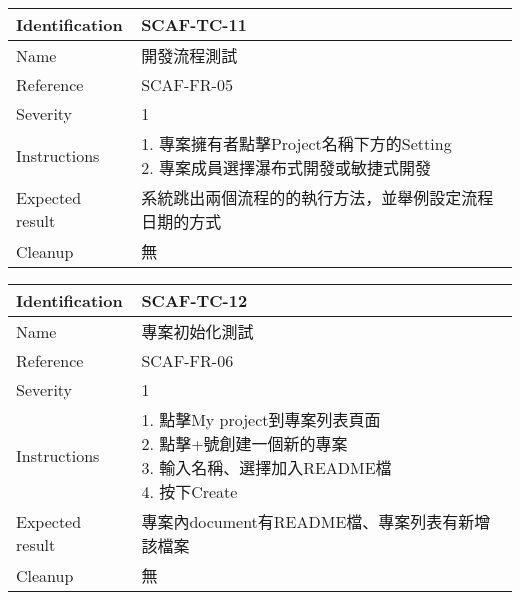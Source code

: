 \documentclass{report}
\begin{document}
\begin{tabularx}{0.9\textwidth}{
  |p{}%
  |p{}|%
  }
  \hline
  \centering Identification &  SCAF-TC-11 \\
  \hline
  \centering Name & 開發流程測試 \\
  \hline
  \centering Reference & SCAF-FR-05 \\
  \hline
  \centering Severity & 1 \\
  \hline
  \centering Instructions & 
  \makecell{
    1. 專案擁有者點擊Project名稱下方的Setting \\
    2. 專案成員選擇瀑布式開發或敏捷式開發 \\
  }\\
  \hline
  \centering Expected result & 系統跳出兩個流程的的執行方法，並舉例設定流程日期的方式 \\
  \hline
  \centering Cleanup & 無 \\
  \hline
\end{tabularx}
\newline\newline

\begin{tabularx}{0.9\textwidth}{
  |p{}%
  |p{}|%
  }
  \hline
  \centering Identification &  SCAF-TC-12 \\
  \hline
  \centering Name & 專案初始化測試 \\
  \hline
  \centering Reference & SCAF-FR-06 \\
  \hline
  \centering Severity & 1 \\
  \hline
  \centering Instructions & 
  \makecell{
    1. 點擊My project到專案列表頁面  \\
    2. 點擊+號創建一個新的專案  \\
    3. 輸入名稱、選擇加入README檔  \\
    4. 按下Create
  }\\
  \hline
  \centering Expected result & 專案內document有README檔、專案列表有新增該檔案 \\
  \hline
  \centering Cleanup & 無 \\
  \hline
\end{tabularx}
\newline\newline
\end{document}

